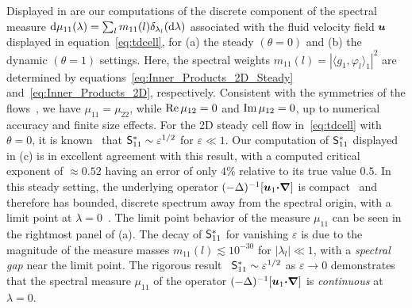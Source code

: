 \documentclass[amsa]{ipart}
\begin{document}
Displayed in  are our
computations of the discrete component of the spectral measure
$\mathrm{d}\mu_{11}(\lambda)=\sum_lm_{11}(l)\delta_{\lambda_l}(\mathrm{d}\lambda)$ associated with the fluid
velocity field $\boldsymbol{u}$ displayed in equation~\eqref{eq:tdcell}, for (a)
the steady $(\theta=0)$ and (b) the dynamic $(\theta=1)$ settings. Here, the
spectral weights $m_{11}(l)=|\langle g_1,\varphi_l\rangle_1|^2$ are determined by
equations~\eqref{eq:Inner_Products_2D_Steady}
and~\eqref{eq:Inner_Products_2D}, respectively.  Consistent with the
symmetries of the flows~\cite{Biferale:PF:2725}, we have
$\mu_{11}=\mu_{22}$, while $\mbox{Re}\,\mu_{12}=0$ and $\mbox{Im}\,\mu_{12}=0$, up to
numerical accuracy and finite size effects. For the 2D steady cell
flow in~\eqref{eq:tdcell} with $\theta=0$, it is
known~\cite{Fannjiang:1994:SIAM_JAM:333} that
$\mathsf{S}^*_{11}\sim\varepsilon^{1/2}$ for $\varepsilon\ll1$. Our computation of $\mathsf{S}^*_{11}$
displayed in (c) is in
excellent agreement with this result, with a computed critical
exponent of $\approx0.52$ having an error of only $4\%$ relative to its true
value $0.5$. In this steady setting, the underlying operator
$(-\Delta)^{-1}[\boldsymbol{u}_1\mbox{\boldmath${\cdot}$}\mbox{\boldmath${\nabla}$}]$ is
compact~\cite{Bhattacharya:AAP:1999:951} and therefore has 
bounded, discrete spectrum away from the spectral origin, with a limit
point at $\lambda=0$~\cite{Stakgold:BVP:2000}. The limit point behavior of  
the measure $\mu_{11}$ can be seen in the rightmost panel of
(a). The decay of $\mathsf{S}^*_{11}$
for vanishing $\varepsilon$ is due to the magnitude of the measure masses
$m_{11}(l)\lesssim10^{-30}$ for $|\lambda_l|\ll1$, with a \emph{spectral gap} near
the limit point. The rigorous
result~\cite{Fannjiang:1994:SIAM_JAM:333} $\mathsf{S}^*_{11}\sim\varepsilon^{1/2}$ as
$\varepsilon\to0$ demonstrates that the spectral measure $\mu_{11}$ of the operator
$(-\Delta)^{-1}[\boldsymbol{u}_1\mbox{\boldmath${\cdot}$}\mbox{\boldmath${\nabla}$}]$ is \emph{continuous} at $\lambda=0$. 
\end{document}
